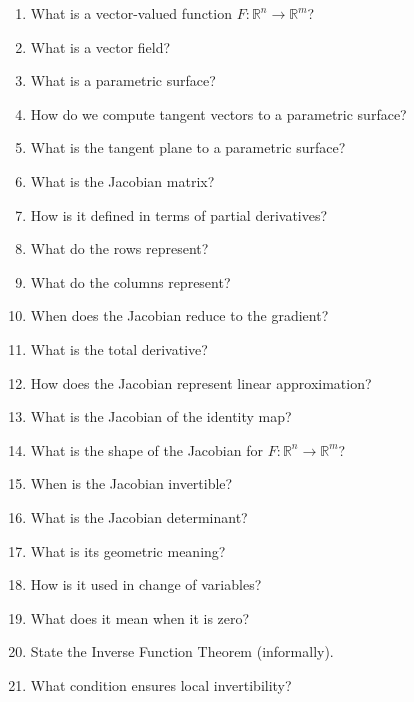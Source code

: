 \begin{enumerate}

\item What is a vector-valued function $F:\mathbb{R}^n \to \mathbb{R}^m$?

\item What is a vector field?

\item What is a parametric surface?

\item How do we compute tangent vectors to a parametric surface?

\item What is the tangent plane to a parametric surface?

\item What is the Jacobian matrix?

\item How is it defined in terms of partial derivatives?

\item What do the rows represent?

\item What do the columns represent?

\item When does the Jacobian reduce to the gradient?

\item What is the total derivative?

\item How does the Jacobian represent linear approximation?

\item What is the Jacobian of the identity map?

\item What is the shape of the Jacobian for $F:\mathbb{R}^n \to \mathbb{R}^m$?

\item When is the Jacobian invertible?

\item What is the Jacobian determinant?

\item What is its geometric meaning?

\item How is it used in change of variables?

\item What does it mean when it is zero?

\item State the Inverse Function Theorem (informally).

\item What condition ensures local invertibility?

\end{enumerate}

